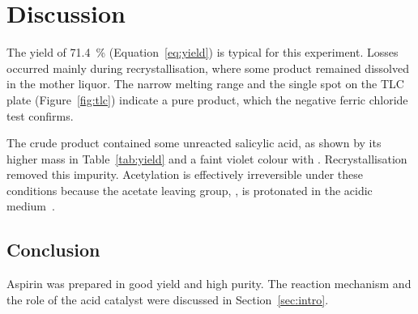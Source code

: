 \section{Discussion}
\label{sec:discussion}

The yield of \SI{71.4}{\percent} (Equation~\ref{eq:yield}) is typical for this
experiment. Losses occurred mainly during recrystallisation, where some product
remained dissolved in the mother liquor. The narrow melting range and the single
spot on the TLC plate (Figure~\ref{fig:tlc}) indicate a pure product, which the
negative ferric chloride test confirms.

The crude product contained some unreacted salicylic acid, as shown by its
higher mass in Table~\ref{tab:yield} and a faint violet colour with
. Recrystallisation removed this impurity. Acetylation is effectively
irreversible under these conditions because the acetate leaving group,
, is protonated in the acidic medium~\cite{clayden2012}.

\subsection{Conclusion}
Aspirin was prepared in good yield and high purity. The reaction mechanism and
the role of the acid catalyst were discussed in Section~\ref{sec:intro}.
